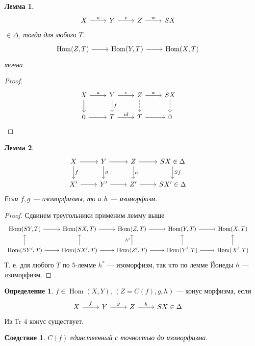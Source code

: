 \documentclass{article}
\newtheorem*{corollary}{Следствие}
\newtheorem*{lemma}{Лемма}
\theoremstyle{definition}
\newtheorem*{definition}{Определение}
\theoremstyle{remark}
\DeclareMathOperator{\Hom}{Hom}
\newenvironment{cd}{\begin{equation*}\begin{tikzcd}}{\end{tikzcd}\end{equation*}}
\begin{document}
\begin{lemma}
    \begin{cd}
        X \rar["u"] & Y \rar["v"] & Z \rar["w"] & SX
    \end{cd}
    $\in \Delta$, тогда для любого $T$.
    \begin{cd}
    \Hom(Z, T) \rar & \Hom(Y, T) \rar & \Hom(X, T)
    \end{cd}
    точна
\end{lemma}
\begin{proof}
    \begin{cd}
        X \rar["u"] \dar & Y \rar["v"] \dar["f"] & Z \rar["w"] \dar[dashed] & SX \dar[dashed]\\
        0 \rar & T \rar["id"] & T \rar & 0
    \end{cd}
\end{proof}

\begin{lemma}
    \begin{cd}
        X \rar \dar["f"] & Y \rar \dar["g"] & Z \rar \dar["h"] & SX \dar["Sf"] \in \Delta \\
        X' \rar & Y' \rar & Z' \rar & SX' \in \Delta
    \end{cd}
    Если $f, g$ --- изоморфизмы, то и $h$ --- изоморфизм.
\end{lemma}
\begin{proof}
    Сдвинем треугольники применим лемму выше
    \begin{cd}
        \Hom(SY, T) \rar & \Hom(SX, T) \rar & \Hom(Z, T) \rar & \Hom(Y, T) \rar & \Hom(X, T) \\
        \Hom(SY', T) \uar \rar & \Hom(SX', T) \rar \uar & \Hom(Z', T) \uar["h^*"] \rar & \Hom(Y', T) \uar \rar & \Hom(X', T) \uar
    \end{cd}
    Т. е. для любого $T$ по 5-лемме $h^*$ --- изоморфизм, так что по лемме Йонеды $h$ --- изоморфизм.
\end{proof}

\begin{definition}
    $f \in \Hom(X, Y)$, $(Z = C(f), g, h)$ --- конус морфизма, если
    \begin{cd}
        X \rar["f"] & Y \rar["g"] & Z \rar["h"] & SX \in \Delta
    \end{cd}
    Из Tr 4 конус существует.
\end{definition}

\begin{corollary}
    $C(f)$ единственный с точностью до изоморфизма.
\end{corollary}
\end{document}

